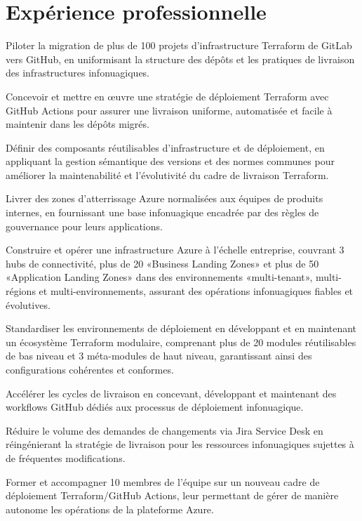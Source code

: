 \documentclass[11pt]{deedy-resume-openfont}
\begin{document}
\section{Expérience professionnelle}
\sectionsepsmall
{}\hfill {}
\begin{tightemize}
\item Piloter la migration de plus de 100 projets d'infrastructure Terraform de GitLab vers GitHub, en uniformisant la structure des dépôts et les pratiques de livraison des infrastructures infonuagiques.
\item Concevoir et mettre en œuvre une stratégie de déploiement Terraform avec GitHub Actions pour assurer une livraison uniforme, automatisée et facile à maintenir dans les dépôts migrés.
\item Définir des composants réutilisables d'infrastructure et de déploiement, en appliquant la gestion sémantique des versions et des normes communes pour améliorer la maintenabilité et l'évolutivité du cadre de livraison Terraform.
\item Livrer des zones d'atterrissage Azure normalisées aux équipes de produits internes, en fournissant une base infonuagique encadrée par des règles de gouvernance pour leurs applications.
\end{tightemize}
\sectionsep
{}
\sectionsep
{}\hfill {}
\begin{tightemize}
\item Construire et opérer une infrastructure Azure à l'échelle entreprise, couvrant 3 hubs de connectivité, plus de 20 «Business Landing Zones» et plus de 50 «Application Landing Zones» dans des environnements «multi-tenant», multi-régions et multi-environnements, assurant des opérations infonuagiques fiables et évolutives.
\item Standardiser les environnements de déploiement en développant et en maintenant un écosystème Terraform modulaire, comprenant plus de 20 modules réutilisables de bas niveau et 3 méta-modules de haut niveau, garantissant ainsi des configurations cohérentes et conformes.
\item Accélérer les cycles de livraison en concevant, développant et maintenant des workflows GitHub dédiés aux processus de déploiement infonuagique.
\item Réduire le volume des demandes de changements via Jira Service Desk en réingénierant la stratégie de livraison pour les ressources infonuagiques sujettes à de fréquentes modifications.
\item Former et accompagner 10 membres de l'équipe sur un nouveau cadre de déploiement Terraform/GitHub Actions, leur permettant de gérer de manière autonome les opérations de la plateforme Azure.
\end{tightemize}
\sectionsep
{}
\end{document}
